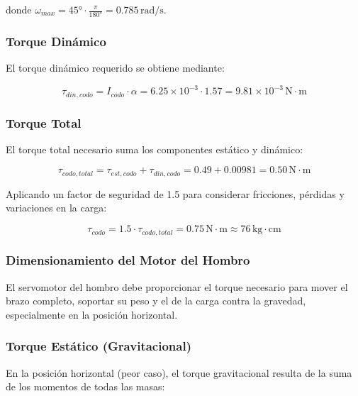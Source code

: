 donde $\omega_{max} = 45° \cdot \frac{\pi}{180°} = 0.785 \, \text{rad/s}$.

\subsubsection{Torque Dinámico}

El torque dinámico requerido se obtiene mediante:

\begin{equation}
\tau_{din,codo} = I_{codo} \cdot \alpha = 6.25 \times 10^{-3} \cdot 1.57 = 9.81 \times 10^{-3} \, \text{N} \cdot \text{m}
\end{equation}

\subsubsection{Torque Total}

El torque total necesario suma los componentes estático y dinámico:

\begin{equation}
\tau_{codo,total} = \tau_{est,codo} + \tau_{din,codo} = 0.49 + 0.00981 = 0.50 \, \text{N} \cdot \text{m}
\end{equation}

Aplicando un factor de seguridad de 1.5 para considerar fricciones, pérdidas y variaciones en la carga:

\begin{equation}
\tau_{codo} = 1.5 \cdot \tau_{codo,total} = 0.75 \, \text{N} \cdot \text{m} \approx 76 \, \text{kg} \cdot \text{cm}
\end{equation}

\subsubsection{Dimensionamiento del Motor del Hombro}

El servomotor del hombro debe proporcionar el torque necesario para mover el brazo completo, soportar su peso y el de la carga contra la gravedad, especialmente en la posición horizontal.

\subsubsection{Torque Estático (Gravitacional)}

En la posición horizontal (peor caso), el torque gravitacional resulta de la suma de los momentos de todas las masas:

